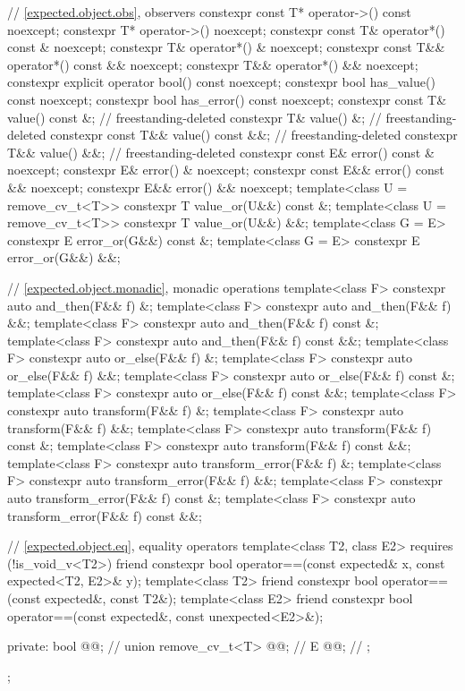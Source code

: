 \begin{codeblock}
{{    // \ref{expected.object.obs}, observers
    constexpr const T* operator->() const noexcept;
    constexpr T* operator->() noexcept;
    constexpr const T& operator*() const & noexcept;
    constexpr T& operator*() & noexcept;
    constexpr const T&& operator*() const && noexcept;
    constexpr T&& operator*() && noexcept;
    constexpr explicit operator bool() const noexcept;
    constexpr bool has_value() const noexcept;
    constexpr bool has_error() const noexcept;
    constexpr const T& value() const &;                                     // freestanding-deleted
    constexpr T& value() &;                                                 // freestanding-deleted
    constexpr const T&& value() const &&;                                   // freestanding-deleted
    constexpr T&& value() &&;                                               // freestanding-deleted
    constexpr const E& error() const & noexcept;
    constexpr E& error() & noexcept;
    constexpr const E&& error() const && noexcept;
    constexpr E&& error() && noexcept;
    template<class U = remove_cv_t<T>> constexpr T value_or(U&&) const &;
    template<class U = remove_cv_t<T>> constexpr T value_or(U&&) &&;
    template<class G = E> constexpr E error_or(G&&) const &;
    template<class G = E> constexpr E error_or(G&&) &&;

    // \ref{expected.object.monadic}, monadic operations
    template<class F> constexpr auto and_then(F&& f) &;
    template<class F> constexpr auto and_then(F&& f) &&;
    template<class F> constexpr auto and_then(F&& f) const &;
    template<class F> constexpr auto and_then(F&& f) const &&;
    template<class F> constexpr auto or_else(F&& f) &;
    template<class F> constexpr auto or_else(F&& f) &&;
    template<class F> constexpr auto or_else(F&& f) const &;
    template<class F> constexpr auto or_else(F&& f) const &&;
    template<class F> constexpr auto transform(F&& f) &;
    template<class F> constexpr auto transform(F&& f) &&;
    template<class F> constexpr auto transform(F&& f) const &;
    template<class F> constexpr auto transform(F&& f) const &&;
    template<class F> constexpr auto transform_error(F&& f) &;
    template<class F> constexpr auto transform_error(F&& f) &&;
    template<class F> constexpr auto transform_error(F&& f) const &;
    template<class F> constexpr auto transform_error(F&& f) const &&;

    // \ref{expected.object.eq}, equality operators
    template<class T2, class E2> requires (!is_void_v<T2>)
      friend constexpr bool operator==(const expected& x, const expected<T2, E2>& y);
    template<class T2>
      friend constexpr bool operator==(const expected&, const T2&);
    template<class E2>
      friend constexpr bool operator==(const expected&, const unexpected<E2>&);

  private:
    bool @@;           // \expos
    union {
      remove_cv_t<T> @@;   // \expos
      E @@;               // \expos
    };
  };
}
\end{codeblock}


